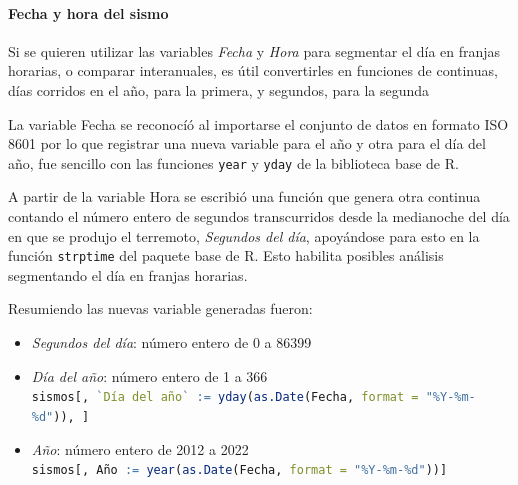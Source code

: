 \documentclass[a4paper]{report}
\begin{document}
\paragraph{Fecha y hora del sismo}
Si se quieren utilizar las variables \emph{Fecha} y \emph{Hora} para segmentar el día en franjas horarias, o comparar interanuales, es útil convertirles en funciones de continuas, días corridos en el año, para la primera, y segundos, para la segunda 

La variable Fecha se reconocíó al importarse el conjunto de datos en formato ISO 8601 por lo que registrar una nueva variable para el año y otra para el día del año, fue sencillo con las funciones \lstinline[language = R]'year' y \lstinline[language = R]'yday' de la biblioteca base de R. 

A partir de la variable Hora se escribió una función que genera otra continua contando el número entero de segundos transcurridos desde la medianoche del día en que se produjo el terremoto, \emph{Segundos del día}, apoyándose para esto en la función \lstinline[language = R]'strptime' del paquete base de R.
Esto habilita posibles análisis segmentando el día en franjas horarias.


Resumiendo las nuevas variable generadas fueron:
\begin{itemize}
	\item \emph{Segundos del día}: número entero de 0 a 86399
	\item \emph{Día del año}: número entero de 1 a 366\\
		\lstinline[language = R]'sismos[, `Día del año` := yday(as.Date(Fecha, format = "%Y-%m-%d")), ]'
	\item \emph{Año}: número entero de 2012 a 2022\\
	\lstinline[language = R]'sismos[, Año := year(as.Date(Fecha, format = "%Y-%m-%d"))]'
\end{itemize}


\end{document}
